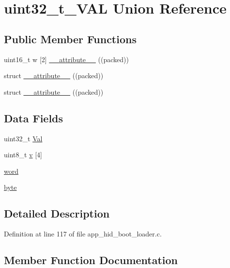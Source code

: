 \hypertarget{unionuint32__t___v_a_l}{}\section{uint32\+\_\+t\+\_\+\+V\+AL Union Reference}
\label{unionuint32__t___v_a_l}
\subsection*{Public Member Functions}
\begin{DoxyCompactItemize}
\item 
uint16\+\_\+t w \mbox{[}2\mbox{]} \mbox{\hyperlink{unionuint32__t___v_a_l_abf6c32cbf434328c8b5e4ad21a2c1bae}{\+\_\+\+\_\+attribute\+\_\+\+\_\+}} ((packed))
\item 
struct \mbox{\hyperlink{unionuint32__t___v_a_l_ab898071398b359603a35c202e9c65f3b}{\+\_\+\+\_\+attribute\+\_\+\+\_\+}} ((packed))
\item 
struct \mbox{\hyperlink{unionuint32__t___v_a_l_ab898071398b359603a35c202e9c65f3b}{\+\_\+\+\_\+attribute\+\_\+\+\_\+}} ((packed))
\end{DoxyCompactItemize}
\subsection*{Data Fields}
\begin{DoxyCompactItemize}
\item 
uint32\+\_\+t \mbox{\hyperlink{unionuint32__t___v_a_l_a4497b7ccdd35adfe3656ecc961faad01}{Val}}
\item 
uint8\+\_\+t \mbox{\hyperlink{unionuint32__t___v_a_l_a29aa7d44788bbf3b5150157df15cb23b}{v}} \mbox{[}4\mbox{]}
\item 
\mbox{\hyperlink{unionuint32__t___v_a_l_a69584ba90b098f23df3702374e594862}{word}}
\item 
\mbox{\hyperlink{unionuint32__t___v_a_l_a82b52bf2b45e214a8f2100ebfdf1aee4}{byte}}
\end{DoxyCompactItemize}


\subsection{Detailed Description}


Definition at line 117 of file app\+\_\+hid\+\_\+boot\+\_\+loader.\+c.



\subsection{Member Function Documentation}
\mbox{\label{unionuint32__t___v_a_l_abf6c32cbf434328c8b5e4ad21a2c1bae}} 
